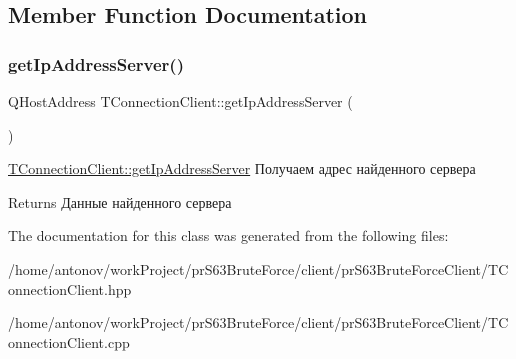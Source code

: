 \subsection{Member Function Documentation}
\mbox{\label{classconnection_1_1_t_connection_client_afa458e30889d97faa2f1f8d9ee41e97e}} 
\subsubsection{\texorpdfstring{get\+Ip\+Address\+Server()}{getIpAddressServer()}}
{\footnotesize\ttfamily Q\+Host\+Address T\+Connection\+Client\+::get\+Ip\+Address\+Server (\begin{DoxyParamCaption}{ }\end{DoxyParamCaption})}



\hyperlink{classconnection_1_1_t_connection_client_afa458e30889d97faa2f1f8d9ee41e97e}{T\+Connection\+Client\+::get\+Ip\+Address\+Server} Получаем адрес найденного сервера 

\begin{DoxyReturn}{Returns}
Данные найденного сервера 
\end{DoxyReturn}


The documentation for this class was generated from the following files\+:\begin{DoxyCompactItemize}
\item 
/home/antonov/work\+Project/pr\+S63\+Brute\+Force/client/pr\+S63\+Brute\+Force\+Client/T\+Connection\+Client.\+hpp\item 
/home/antonov/work\+Project/pr\+S63\+Brute\+Force/client/pr\+S63\+Brute\+Force\+Client/T\+Connection\+Client.\+cpp\end{DoxyCompactItemize}
